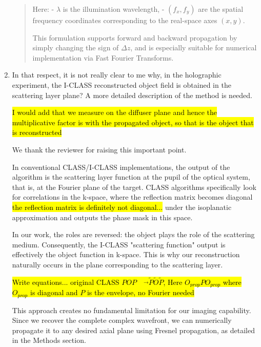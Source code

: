 \documentclass[12pt]{article}
\newcommand{\hlred}[1]{\sethlcolor{red!30}\hl{#1}}
\newenvironment{solved_reviewercomment}
    {\begin{tcolorbox}[width=\linewidth,colback=gray!5,colframe=solved_commentcolor!50,title=Reviewer Comment,left=5pt,right=5pt]}
    {\end{tcolorbox}}
\newenvironment{ourresponse}
    {\begin{tcolorbox}[width=\linewidth,breakable,enhanced,colback=gray!5,colframe=responsecolor!50,title=Response,left=5pt,right=5pt]}
    {\end{tcolorbox}}
\begin{document}
\begin{enumerate}[label=\arabic*.]
\begin{ourresponse}
\begin{quote}
            Here:
            - $ \lambda $ is the illumination wavelength,
            - $ (f_x, f_y) $ are the spatial frequency coordinates corresponding to the real-space axes $ (x, y) $.
            
            This formulation supports forward and backward propagation by simply changing the sign of $ \Delta z $, and is especially suitable for numerical implementation via Fast Fourier Transforms.
            
        \end{quote}

                
    \end{ourresponse}

    
    \item \leavevmode\vspace{-\baselineskip}
    \begin{solved_reviewercomment}
        In that respect, it is not really clear to me why, in the holographic experiment, the I-CLASS reconstructed object field is obtained in the scattering layer plane? A more detailed description of the method is needed.
    \end{solved_reviewercomment}
        

    \begin{ourresponse}
        \hlred{I would add that we measure on the diffuser plane and hence the multiplicative factor is with the propagated object, so that is the object that is reconstructed}

    
        We thank the reviewer for raising this important point.
        
        In conventional CLASS/I-CLASS implementations, the output of the algorithm is the scattering layer function at the pupil of the optical system, that is, at the Fourier plane of the target. CLASS algorithms specifically look for correlations in the k-space, where the reflection matrix becomes diagonal         \hlred{the reflection matrix is definitely not diagonal...  }
 under the isoplanatic approximation and outputs the phase mask in this space.
        
        In our work, the roles are reversed: the object plays the role of the scattering medium. Consequently, the I-CLASS "scattering function" output is effectively the object function in k-space. This is why our reconstruction naturally occurs in the plane corresponding to the scattering layer.


        \hlred{Write equations... original CLASS $POP\quad \overrightarrow{}\tilde{P}\tilde{O}\tilde{P}$, Here $O_{prop}PO_{prop}$ where $O_{prop}$ is diagonal and $P$ is the envelope, no Fourier needed}
        
        This approach creates no fundamental limitation for our imaging capability. Since we recover the complete complex wavefront, we can numerically propagate it to any desired axial plane using Fresnel propagation, as detailed in the Methods section.
    \end{ourresponse}

\end{enumerate}
\end{document}

